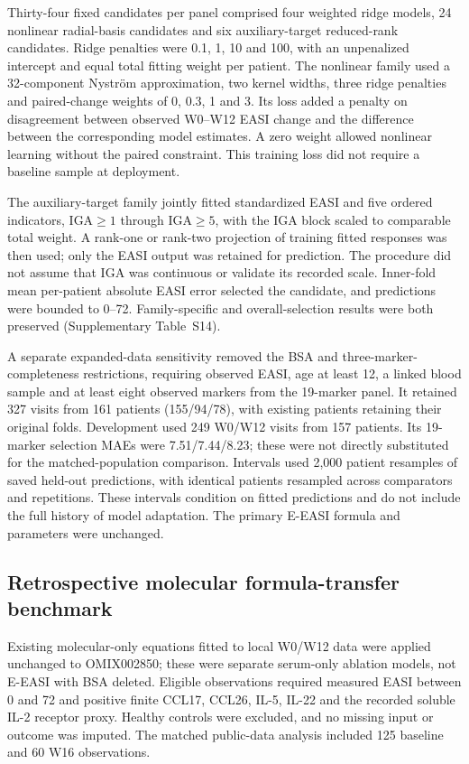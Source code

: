 Thirty-four fixed candidates per panel comprised four weighted ridge models, 24 nonlinear radial-basis candidates and six auxiliary-target reduced-rank candidates. Ridge penalties were 0.1, 1, 10 and 100, with an unpenalized intercept and equal total fitting weight per patient. The nonlinear family used a 32-component Nystr\"om approximation, two kernel widths, three ridge penalties and paired-change weights of 0, 0.3, 1 and 3. Its loss added a penalty on disagreement between observed W0--W12 EASI change and the difference between the corresponding model estimates. A zero weight allowed nonlinear learning without the paired constraint. This training loss did not require a baseline sample at deployment.

The auxiliary-target family jointly fitted standardized EASI and five ordered indicators, IGA$\geq1$ through IGA$\geq5$, with the IGA block scaled to comparable total weight. A rank-one or rank-two projection of training fitted responses was then used; only the EASI output was retained for prediction. The procedure did not assume that IGA was continuous or validate its recorded scale. Inner-fold mean per-patient absolute EASI error selected the candidate, and predictions were bounded to 0--72. Family-specific and overall-selection results were both preserved (Supplementary Table~S14).

A separate expanded-data sensitivity removed the BSA and three-marker-completeness restrictions, requiring observed EASI, age at least 12, a linked blood sample and at least eight observed markers from the 19-marker panel. It retained 327 visits from 161 patients (155/94/78), with existing patients retaining their original folds. Development used 249 W0/W12 visits from 157 patients. Its 19-marker selection MAEs were 7.51/7.44/8.23; these were not directly substituted for the matched-population comparison. Intervals used 2,000 patient resamples of saved held-out predictions, with identical patients resampled across comparators and repetitions. These intervals condition on fitted predictions and do not include the full history of model adaptation. The primary E-EASI formula and parameters were unchanged.

\subsection*{Retrospective molecular formula-transfer benchmark}
Existing molecular-only equations fitted to local W0/W12 data were applied unchanged to OMIX002850; these were separate serum-only ablation models, not E-EASI with BSA deleted. Eligible observations required measured EASI between 0 and 72 and positive finite CCL17, CCL26, IL-5, IL-22 and the recorded soluble IL-2 receptor proxy. Healthy controls were excluded, and no missing input or outcome was imputed. The matched public-data analysis included 125 baseline and 60 W16 observations.\citep{wu2023}


